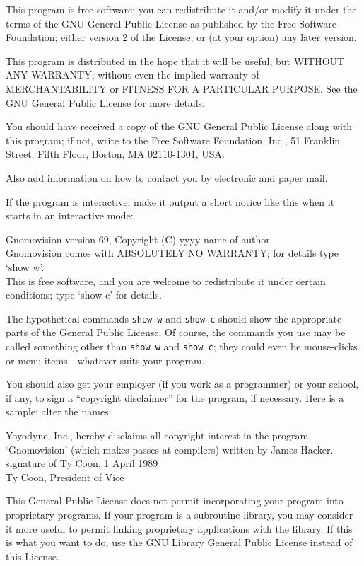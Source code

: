 \begin{lrbox}{\gpl}
\begin{minipage}{3\textwidth}
	This program is free software; you can redistribute it and/or modify
	it under the terms of the GNU General Public License as published by
	the Free Software Foundation; either version 2 of the License, or
	(at your option) any later version.

	This program is distributed in the hope that it will be useful,
	but WITHOUT ANY WARRANTY; without even the implied warranty of
	MERCHANTABILITY or FITNESS FOR A PARTICULAR PURPOSE.  See the
	GNU General Public License for more details.

	You should have received a copy of the GNU General Public License
	along with this program; if not, write to the Free Software
	Foundation, Inc., 51 Franklin Street, Fifth Floor, Boston, MA  02110-1301, USA.
\endnarrower

Also add information on how to contact you by electronic and paper mail.

If the program is interactive, make it output a short notice like this
when it starts in an interactive mode:

\beginnarrower
	Gnomovision version 69, Copyright (C) yyyy  name of author \\
	Gnomovision comes with ABSOLUTELY NO WARRANTY; for details type `show w'. \\
	This is free software, and you are welcome to redistribute it
	under certain conditions; type `show c' for details.
\endnarrower


The hypothetical commands {\tt show w} and {\tt show c} should show the
appropriate parts of the General Public License.  Of course, the commands
you use may be called something other than {\tt show w} and {\tt show c};
they could even be mouse-clicks or menu items---whatever suits your
program.

You should also get your employer (if you work as a programmer) or your
school, if any, to sign a ``copyright disclaimer'' for the program, if
necessary.  Here is a sample; alter the names:

\beginnarrower
Yoyodyne, Inc., hereby disclaims all copyright interest in the program \\
`Gnomovision' (which makes passes at compilers) written by James Hacker. \\

signature of Ty Coon, 1 April 1989 \\
Ty Coon, President of Vice
\endnarrower


This General Public License does not permit incorporating your program
into proprietary programs.  If your program is a subroutine library, you
may consider it more useful to permit linking proprietary applications
with the library.  If this is what you want to do, use the GNU Library
General Public License instead of this License.

\endtriplecolumns
\end{minipage}
\end{lrbox}

\begincentered
	\scalebox{0.33}{\usebox{\gpl}}
\endcentered

\endsection

\endinput

